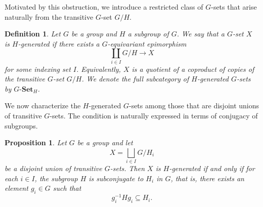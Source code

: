 \documentclass[10pt,a4paper]{amsart}
\newtheorem{proposition}{Proposition}
\newtheorem{definition}{Definition}
\begin{document}
Motivated by this obstruction, we introduce a restricted class of $G$-sets that arise naturally from the transitive $G$-set $G/H$.

\begin{definition}\label{def:H_generated}
Let $G$ be a group and $H$ a subgroup of $G$. We say that a $G$-set $X$ is \emph{$H$-generated} if there exists a $G$-equivariant epimorphism
\[
\coprod_{i \in I} G/H \longrightarrow X
\]
for some indexing set $I$. Equivalently, $X$ is a quotient of a coproduct of copies of the transitive $G$-set $G/H$. We denote the full subcategory of $H$-generated $G$-sets by $G\text{-}\mathbf{Set}_H$.
\end{definition}

 

We now characterize the $H$-generated $G$-sets among those that are disjoint unions of transitive $G$-sets. The condition is naturally expressed in terms of conjugacy of subgroups.

\begin{proposition}\label{prop:H_generated_criterion}
Let $G$ be a group and let
\[
X = \bigsqcup_{i \in I} G/H_i
\]
be a disjoint union of transitive $G$-sets. Then $X$ is $H$-generated if and only if for each $i \in I$, the subgroup $H$ is subconjugate to $H_i$ in $G$, that is, there exists an element $g_i \in G$ such that
\[
g_i^{-1} H g_i \subseteq H_i.
\]
\end{proposition}
\end{document}
